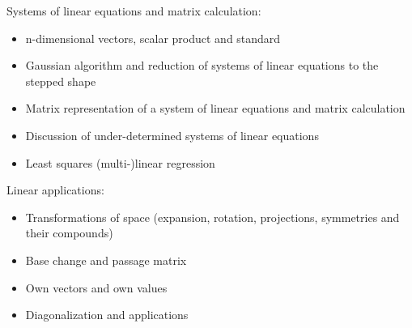 Systems of linear equations and matrix calculation:
\begin{itemize}
    \item n-dimensional vectors, scalar product and standard
    \item Gaussian algorithm and reduction of systems of linear equations to the stepped shape
    \item Matrix representation of a system of linear equations and matrix calculation
    \item Discussion of under-determined systems of linear equations
    \item Least squares (multi-)linear regression
\end{itemize}
Linear applications:
\begin{itemize}
    \item Transformations of space (expansion, rotation, projections, symmetries and their compounds)
    \item Base change and passage matrix
    \item Own vectors and own values
    \item Diagonalization and applications
\end{itemize}